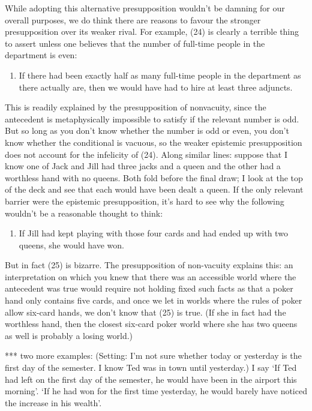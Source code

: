 While adopting this alternative presupposition wouldn't be damning for
our overall purposes, we do think there are reasons to favour the
stronger presupposition over its weaker rival. For example, (24) is
clearly a terrible thing to assert unless one believes that the number
of full-time people in the department is even:

\begin{enumerate}
\def\labelenumi{(\arabic{enumi})}
\setcounter{enumi}{32}
\itemsep1pt\parskip0pt
\item
  If there had been exactly half as many full-time people in the
  department as there actually are, then we would have had to hire at
  least three adjuncts.
\end{enumerate}

This is readily explained by the presupposition of nonvacuity, since the
antecedent is metaphysically impossible to satisfy if the relevant
number is odd. But so long as you don't know whether the number is odd
or even, you don't know whether the conditional is vacuous, so the
weaker epistemic presupposition does not account for the infelicity of
(24). Along similar lines: suppose that I know one of Jack and Jill had
three jacks and a queen and the other had a worthless hand with no
queens. Both fold before the final draw; I look at the top of the deck
and see that each would have been dealt a queen. If the only relevant
barrier were the epistemic presupposition, it's hard to see why the
following wouldn't be a reasonable thought to think:

\begin{enumerate}
\def\labelenumi{(\arabic{enumi})}
\setcounter{enumi}{33}
\itemsep1pt\parskip0pt
\item
  If Jill had kept playing with those four cards and had ended up with
  two queens, she would have won.
\end{enumerate}

But in fact (25) is bizarre. The presupposition of non-vacuity explains
this: an interpretation on which you knew that there was an accessible
world where the antecedent was true would require not holding fixed such
facts as that a poker hand only contains five cards, and once we let in
worlds where the rules of poker allow six-card hands, we don't know that
(25) is true. (If she in fact had the worthless hand, then the closest
six-card poker world where she has two queens as well is probably a
losing world.)

*** two more examples: (Setting: I'm not sure whether today or yesterday
is the first day of the semester. I know Ted was in town until
yesterday.) I say `If Ted had left on the first day of the semester, he
would have been in the airport this morning'. `If he had won for the
first time yesterday, he would barely have noticed the increase in his
wealth'.


